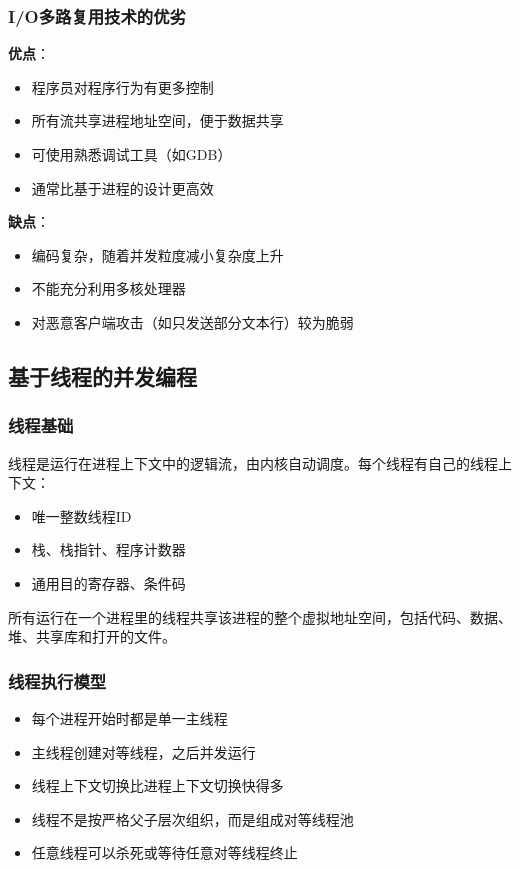 \subsubsection{I/O多路复用技术的优劣}
\textbf{优点}：
\begin{itemize}
    \item 程序员对程序行为有更多控制
    \item 所有流共享进程地址空间，便于数据共享
    \item 可使用熟悉调试工具（如GDB）
    \item 通常比基于进程的设计更高效
\end{itemize}

\textbf{缺点}：
\begin{itemize}
    \item 编码复杂，随着并发粒度减小复杂度上升
    \item 不能充分利用多核处理器
    \item 对恶意客户端攻击（如只发送部分文本行）较为脆弱
\end{itemize}

\subsection{基于线程的并发编程}

\subsubsection{线程基础}
线程是运行在进程上下文中的逻辑流，由内核自动调度。每个线程有自己的线程上下文：
\begin{itemize}
    \item 唯一整数线程ID
    \item 栈、栈指针、程序计数器
    \item 通用目的寄存器、条件码
\end{itemize}

所有运行在一个进程里的线程共享该进程的整个虚拟地址空间，包括代码、数据、堆、共享库和打开的文件。

\subsubsection{线程执行模型}
\begin{itemize}
    \item 每个进程开始时都是单一主线程
    \item 主线程创建对等线程，之后并发运行
    \item 线程上下文切换比进程上下文切换快得多
    \item 线程不是按严格父子层次组织，而是组成对等线程池
    \item 任意线程可以杀死或等待任意对等线程终止
\end{itemize}

